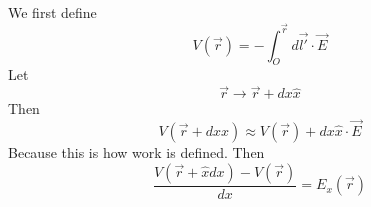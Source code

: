 \documentclass{article}
\newtheorem{one minute paper}[theorem]{One Minute Paper}
\begin{document}
We first define 
\begin{equation}
    V(\vec{r}) = -\int_{O}^{\vec{r}}d\vec{l'} \cdot \vec{E}
\end{equation}
Let 
\begin{equation}
    \vec{r} \rightarrow \vec{r} + dx \hat{x}
\end{equation}
Then 
\begin{equation}
    V(\vec{r} + dx\hat{x}) \approx V(\vec{r}) + dx \hat{x} \cdot \vec{E}
\end{equation}
Because this is how work is defined. Then 
\begin{equation}
    \frac{V(\vec{r} + \hat{x}dx) - V(\vec{r})}{dx} = E_{x}(\vec{r})
\end{equation}
\end{document}
